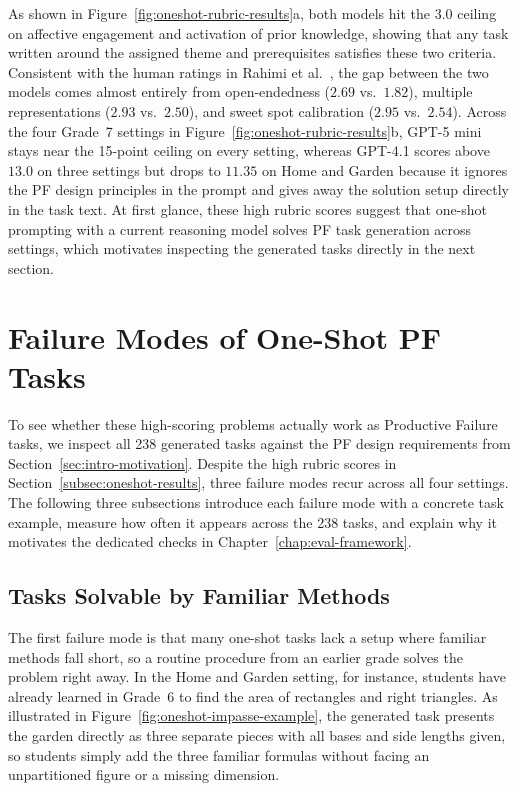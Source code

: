 As shown in Figure~\ref{fig:oneshot-rubric-results}a, both models hit the $3.0$ ceiling on affective engagement and activation of prior knowledge, showing that any task written around the assigned theme and prerequisites satisfies these two criteria. Consistent with the human ratings in Rahimi et al.~\cite{rahimi2025}, the gap between the two models comes almost entirely from open-endedness ($2.69$ vs.\ $1.82$), multiple representations ($2.93$ vs.\ $2.50$), and sweet spot calibration ($2.95$ vs.\ $2.54$). Across the four Grade~7 settings in Figure~\ref{fig:oneshot-rubric-results}b, GPT-5 mini stays near the 15-point ceiling on every setting, whereas GPT-4.1 scores above $13.0$ on three settings but drops to $11.35$ on Home and Garden because it ignores the PF design principles in the prompt and gives away the solution setup directly in the task text. At first glance, these high rubric scores suggest that one-shot prompting with a current reasoning model solves PF task generation across settings, which motivates inspecting the generated tasks directly in the next section.

\section{Failure Modes of One-Shot PF Tasks}
\label{sec:oneshot-biases}

To see whether these high-scoring problems actually work as Productive Failure tasks, we inspect all 238 generated tasks against the PF design requirements from Section~\ref{sec:intro-motivation}. Despite the high rubric scores in Section~\ref{subsec:oneshot-results}, three failure modes recur across all four settings. The following three subsections introduce each failure mode with a concrete task example, measure how often it appears across the 238 tasks, and explain why it motivates the dedicated checks in Chapter~\ref{chap:eval-framework}.

\subsection{Tasks Solvable by Familiar Methods}
\label{subsec:routine-story-bias}
The first failure mode is that many one-shot tasks lack a setup where familiar methods fall short, so a routine procedure from an earlier grade solves the problem right away. In the Home and Garden setting, for instance, students have already learned in Grade~6 to find the area of rectangles and right triangles. As illustrated in Figure~\ref{fig:oneshot-impasse-example}, the generated task presents the garden directly as three separate pieces with all bases and side lengths given, so students simply add the three familiar formulas without facing an unpartitioned figure or a missing dimension.

